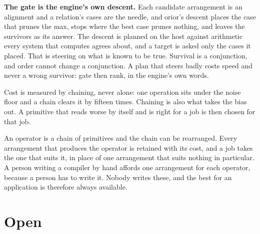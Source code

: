 \textbf{The gate is the engine's own descent.} Each candidate arrangement is an alignment and a relation's cases are the needle, and orior's descent places the case that prunes the max, stops where the best case prunes nothing, and leaves the survivors as its answer. The descent is planned on the host against arithmetic every system that computes agrees about, and a target is asked only the cases it placed. That is steering on what is known to be true. Survival is a conjunction, and order cannot change a conjunction. A plan that steers badly costs speed and never a wrong survivor: gate then rank, in the engine's own words.

Cost is measured by chaining, never alone: one operation sits under the noise floor and a chain clears it by fifteen times. Chaining is also what takes the bias out. A primitive that reads worse by itself and is right for a job is then chosen for that job.

An operator is a chain of primitives and the chain can be rearranged. Every arrangement that produces the operator is retained with its cost, and a job takes the one that suits it, in place of one arrangement that suits nothing in particular. A person writing a compiler by hand affords one arrangement for each operator, because a person has to write it. Nobody writes these, and the best for an application is therefore always available.

\section{\texorpdfstring{Open}{Open}}

